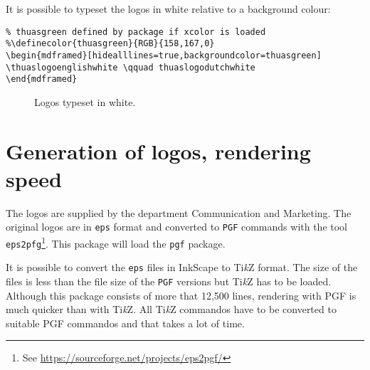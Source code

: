 \documentclass[a4paper,12pt]{article}
\begin{document}
It is possible to typeset the logos in white relative to a background colour:

\begin{verbatim}
% thuasgreen defined by package if xcolor is loaded
%\definecolor{thuasgreen}{RGB}{158,167,0}
\begin{mdframed}[hidealllines=true,backgroundcolor=thuasgreen]
\thuaslogoenglishwhite \qquad thuaslogodutchwhite
\end{mdframed}
\end{verbatim}

\begin{figure}[H]
\centering
\begin{mdframed}[hidealllines=true,backgroundcolor=thuasgreen]
\centering
\resizebox{0.9\textwidth}{!}{\thuaslogoenglishwhite \qquad \thuaslogodutchwhite}
\end{mdframed}
\caption{Logos typeset in white.}
\end{figure}


\section{Generation of logos, rendering speed}
The logos are supplied by the department Communication and Marketing. The original logos
are in \verb|eps| format and converted to \verb|PGF| commands with the tool
\verb|eps2pfg|\footnote{See \url{https://sourceforge.net/projects/eps2pgf/}}. This
package will load the \verb|pgf| package.

It is possible to convert the \verb|eps| files in InkScape to Ti\emph{k}Z format. The
size of the files is less than the file size of the \verb|PGF| versions but Ti\emph{k}Z
has to be loaded. Although this package consists of more that 12,500 lines, rendering
with PGF is much quicker than with Ti\emph{k}Z. All Ti\emph{k}Z commandos have to be
converted to suitable PGF commandos and that takes a lot of time.
\end{document}
